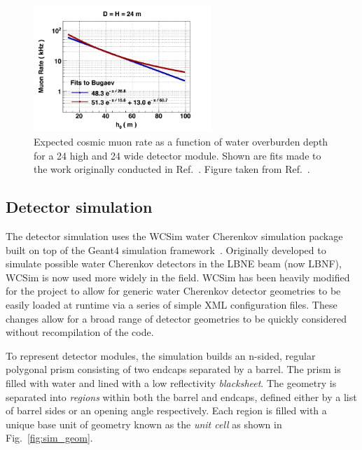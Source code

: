 \begin{figure} %
    \includegraphics[width=0.6\textwidth]{diagrams/4-chips/cosmic_rate.png}
    \caption[Expected \chipsfive cosmic muon rate as a function of depth.]
    {Expected cosmic muon rate as a function of water overburden depth for a \unit{24}{}
        high and \unit{24}{} wide \chips detector module. Shown are fits made to the
        work originally conducted in Ref.~\cite{bugaev1998}. Figure taken from
        Ref.~\cite{son2013}.}
    \label{fig:cosmic_rate}
\end{figure}

\subsection{Detector simulation} %
\label{sec:chips_monte_carlo_sim} %

The detector simulation uses the WCSim water Cherenkov simulation package~\cite{wcsim2020} built
on top of the Geant4 simulation framework~\cite{agostinelli2003, allison2006, Allison2016}.
Originally developed to simulate possible water Cherenkov detectors in the LBNE beam (now LBNF),
WCSim is now used more widely in the field. WCSim has been heavily modified for the \chips project
to allow for generic water Cherenkov detector geometries to be easily loaded at runtime via a
series of simple XML configuration files. These changes allow for a broad range of detector
geometries to be quickly considered without recompilation of the code.

To represent \chips detector modules, the simulation builds an n-sided, regular polygonal prism
consisting of two endcaps separated by a barrel. The prism is filled with water and lined with a
low reflectivity \emph{blacksheet}. The geometry is separated into \emph{regions} within both the
barrel and endcaps, defined either by a list of barrel sides or an opening angle respectively.
Each region is filled with a unique base unit of geometry known as the \emph{unit cell} as shown
in Fig.~\ref{fig:sim_geom}.


